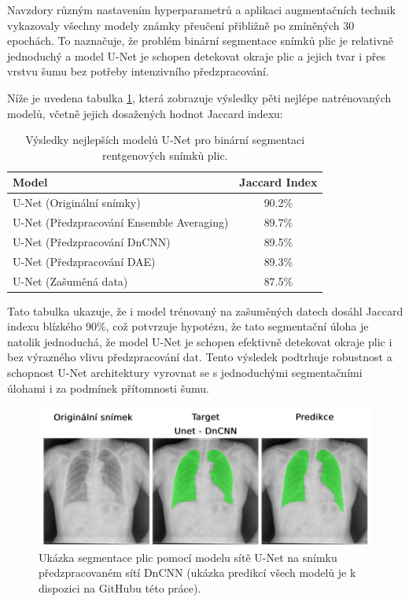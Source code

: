 \documentclass[male,czech,api_ing]{thesis}
\begin{document}
Navzdory různým nastavením hyperparametrů a aplikaci augmentačních technik vykazovaly všechny modely známky přeučení přibližně po zmíněných 30 epochách. To naznačuje, že problém binární segmentace snímků plic je relativně jednoduchý a model U-Net je schopen detekovat okraje plic a jejich tvar i přes vrstvu šumu bez potřeby intenzivního předzpracování.

Níže je uvedena tabulka \ref{tab:BinaryUnetResults}, která zobrazuje výsledky pěti nejlépe natrénovaných modelů, včetně jejich dosažených hodnot Jaccard indexu:

\begin{table}[h]
    \centering
    \begin{tabular}{|l|c|}
        \hline
        \textbf{Model}                            & \textbf{Jaccard Index} \\ \hline
        U-Net (Originální snímky)                 & 90.2\%                 \\ \hline
        U-Net (Předzpracování Ensemble Averaging) & 89.7\%                 \\ \hline
        U-Net (Předzpracování DnCNN)              & 89.5\%                 \\ \hline
        U-Net (Předzpracování DAE)                & 89.3\%                 \\ \hline
        U-Net (Zašuměná data)                     & 87.5\%                 \\ \hline
    \end{tabular}
    \caption{Výsledky nejlepších modelů U-Net pro binární segmentaci rentgenových snímků plic.}
    \label{tab:BinaryUnetResults}
\end{table}

Tato tabulka ukazuje, že i model trénovaný na zašuměných datech dosáhl Jaccard indexu blízkého 90\%, což potvrzuje hypotézu, že tato segmentační úloha je natolik jednoduchá, že model U-Net je schopen efektivně detekovat okraje plic i bez výrazného vlivu předzpracování dat. Tento výsledek podtrhuje robustnost a schopnost U-Net architektury vyrovnat se s jednoduchými segmentačními úlohami i za podmínek přítomnosti šumu.

\begin{figure}[h]
    \centering
    \includegraphics[width=\linewidth]{Prilohy/Obrazky/BinaryUnetDnCNN.png}
    \caption{Ukázka segmentace plic pomocí modelu sítě U-Net na snímku předzpracovaném sítí DnCNN (ukázka predikcí všech modelů je k dispozici na GitHubu této práce).}
    \label{fig:BinaryUnet}
\end{figure}
\end{document}
